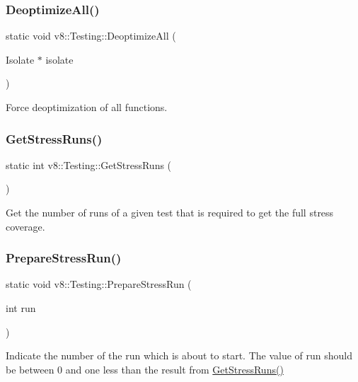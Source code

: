 \subsubsection{\texorpdfstring{Deoptimize\+All()}{DeoptimizeAll()}}
{\footnotesize\ttfamily static void v8\+::\+Testing\+::\+Deoptimize\+All (\begin{DoxyParamCaption}\item[{Isolate $\ast$}]{isolate }\end{DoxyParamCaption})\hspace{0.3cm}{\ttfamily [static]}}

Force deoptimization of all functions. \mbox{\label{classv8_1_1Testing_adc876063b1e07462b8d9544dd8efab36}} 
\subsubsection{\texorpdfstring{Get\+Stress\+Runs()}{GetStressRuns()}}
{\footnotesize\ttfamily static int v8\+::\+Testing\+::\+Get\+Stress\+Runs (\begin{DoxyParamCaption}{ }\end{DoxyParamCaption})\hspace{0.3cm}{\ttfamily [static]}}

Get the number of runs of a given test that is required to get the full stress coverage. \mbox{\label{classv8_1_1Testing_ab9da044b18b9d05770b655bed27ed7f4}} 
\subsubsection{\texorpdfstring{Prepare\+Stress\+Run()}{PrepareStressRun()}}
{\footnotesize\ttfamily static void v8\+::\+Testing\+::\+Prepare\+Stress\+Run (\begin{DoxyParamCaption}\item[{int}]{run }\end{DoxyParamCaption})\hspace{0.3cm}{\ttfamily [static]}}

Indicate the number of the run which is about to start. The value of run should be between 0 and one less than the result from \mbox{\hyperlink{classv8_1_1Testing_adc876063b1e07462b8d9544dd8efab36}{Get\+Stress\+Runs()}} \mbox{\label{classv8_1_1Testing_aafa5a4917998aa64134aa750ce5c4b2e}} 
